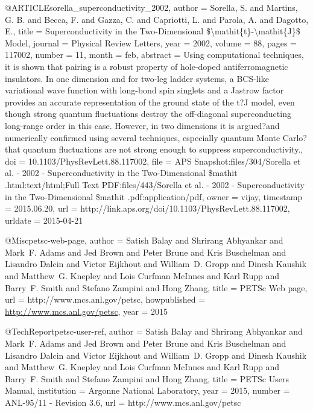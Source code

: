 @ARTICLE{sorella_superconductivity_2002,
  author = {Sorella, S. and Martins, G. B. and Becca, F. and Gazza, C. and Capriotti,
	L. and Parola, A. and Dagotto, E.},
  title = {Superconductivity in the {Two}-{Dimensional} \${\textbackslash}mathit\{t\}-{\textbackslash}mathit\{{J}\}\$
	{Model}},
  journal = {Physical Review Letters},
  year = {2002},
  volume = {88},
  pages = {117002},
  number = {11},
  month = feb,
  abstract = {Using computational techniques, it is shown that pairing is a robust
	property of hole-doped antiferromagnetic insulators. In one dimension
	and for two-leg ladder systems, a BCS-like variational wave function
	with long-bond spin singlets and a Jastrow factor provides an accurate
	representation of the ground state of the t?J model, even though
	strong quantum fluctuations destroy the off-diagonal superconducting
	long-range order in this case. However, in two dimensions it is argued?and
	numerically confirmed using several techniques, especially quantum
	Monte Carlo?that quantum fluctuations are not strong enough to suppress
	superconductivity.},
  doi = {10.1103/PhysRevLett.88.117002},
  file = {APS Snapshot:files/304/Sorella et al. - 2002 - Superconductivity in the Two-Dimensional \$mathit .html:text/html;Full Text PDF:files/443/Sorella et al. - 2002 - Superconductivity in the Two-Dimensional \$mathit .pdf:application/pdf},
  owner = {vijay},
  timestamp = {2015.06.20},
  url = {http://link.aps.org/doi/10.1103/PhysRevLett.88.117002},
  urldate = {2015-04-21}
}

@Misc{petsc-web-page,
            author = {Satish Balay and Shrirang Abhyankar and Mark~F. Adams and Jed Brown and Peter Brune
                      and Kris Buschelman and Lisandro Dalcin and Victor Eijkhout and William~D. Gropp
                      and Dinesh Kaushik and Matthew~G. Knepley
                      and Lois Curfman McInnes and Karl Rupp and Barry~F. Smith
                      and Stefano Zampini and Hong Zhang},
            title =  {{PETS}c {W}eb page},
            url =    {http://www.mcs.anl.gov/petsc},
            howpublished = {\url{http://www.mcs.anl.gov/petsc}},
            year = {2015}
}

@TechReport{petsc-user-ref,
  author = {Satish Balay and Shrirang Abhyankar and Mark~F. Adams and Jed Brown and Peter Brune
            and Kris Buschelman and Lisandro Dalcin and Victor Eijkhout and William~D. Gropp
            and Dinesh Kaushik and Matthew~G. Knepley
            and Lois Curfman McInnes and Karl Rupp and Barry~F. Smith
            and Stefano Zampini and Hong Zhang},
  title  = {{PETS}c Users Manual},
  institution = {Argonne National Laboratory},
  year   = 2015,
  number = {ANL-95/11 - Revision 3.6},
  url    = {http://www.mcs.anl.gov/petsc}
}

